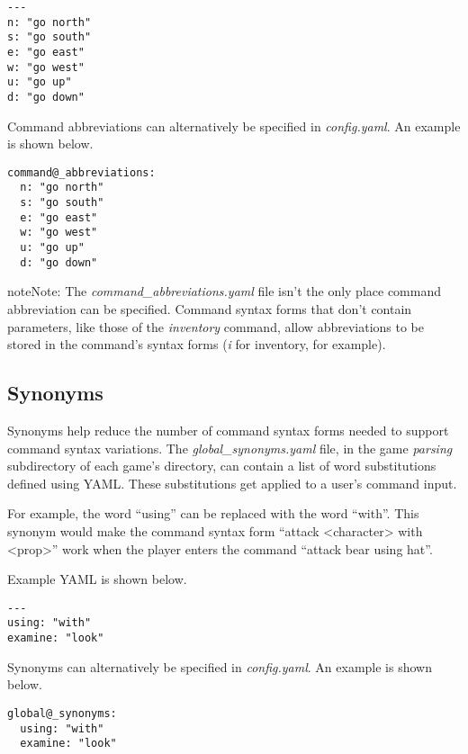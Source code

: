 \documentclass[letterpaper,10pt,english]{sphinxmanual}
\begin{document}
\begin{Verbatim}[commandchars=@\[\]]
---
n: "go north"
s: "go south"
e: "go east"
w: "go west"
u: "go up"
d: "go down"
\end{Verbatim}

Command abbreviations can alternatively be specified in \emph{config.yaml}. An example is shown below.

\begin{Verbatim}[commandchars=@\[\]]
command@_abbreviations:
  n: "go north"
  s: "go south"
  e: "go east"
  w: "go west"
  u: "go up"
  d: "go down"
\end{Verbatim}

\begin{notice}{note}{Note:}
The \emph{command\_abbreviations.yaml} file isn't the only place command abbreviation can be specified. Command syntax forms that don't contain parameters, like those of the \emph{inventory} command, allow abbreviations to be stored in the command's syntax forms (\emph{i} for inventory, for example).
\end{notice}


\subsection{Synonyms}
\label{fine_tuning:synonyms}
Synonyms help reduce the number of command syntax forms needed to support command syntax variations. The \emph{global\_synonyms.yaml} file, in the game \emph{parsing} subdirectory of each game's directory, can contain a list of word substitutions defined using YAML. These substitutions get applied to a user's command input.

For example, the word ``using'' can be replaced with the word ``with''. This synonym would make the command syntax form ``attack \textless{}character\textgreater{} with \textless{}prop\textgreater{}'' work when the player enters the command ``attack bear using hat''.

Example YAML is shown below.

\begin{Verbatim}[commandchars=@\[\]]
---
using: "with"
examine: "look"
\end{Verbatim}

Synonyms can alternatively be specified in \emph{config.yaml}. An example is shown below.

\begin{Verbatim}[commandchars=@\[\]]
global@_synonyms:
  using: "with"
  examine: "look"
\end{Verbatim}
\end{document}
